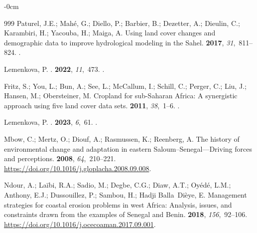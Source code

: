 \documentclass[earth,article,accept,pdftex,moreauthors]{Definitions/mdpi}
\begin{document}
{\begin{adjustwidth}{-\extralength}{0cm}
\begin{thebibliography}{999}
Paturel, J.E.; Mahé, G.; Diello, P.; Barbier, B.; Dezetter, A.; Dieulin, C.;
  Karambiri, H.; Yacouba, H.; Maiga, A.
\newblock Using land cover changes and demographic data to improve hydrological
  modeling in the Sahel.
 {\bf 2017}, {\em 31},~811--824.
.

Lemenkova, P.
.
 {\bf 2022}, {\em
  11},~473.
.

Fritz, S.; You, L.; Bun, A.; See, L.; McCallum, I.; Schill, C.; Perger, C.;
  Liu, J.; Hansen, M.; Obersteiner, M.
\newblock Cropland for sub-Saharan Africa: A synergistic approach using five
  land cover data sets.
 {\bf 2011}, {\em 38},~1--6. %
.

Lemenkova, P.
.
 {\bf 2023}, {\em 6},~61.
.

Mbow, C.; Mertz, O.; Diouf, A.; Rasmussen, K.; Reenberg, A.
\newblock The history of environmental change and adaptation in eastern
  Saloum–Senegal—Driving forces and perceptions.
 {\bf 2008}, {\em 64},~210--221. %
  {\url{https://doi.org/10.1016/j.gloplacha.2008.09.008}}.

Ndour, A.; Laïbi, R.A.; Sadio, M.; Degbe, C.G.; Diaw, A.T.; Oyédé, L.M.;
  Anthony, E.J.; Dussouillez, P.; Sambou, H.; Hadji Balla~Dièye, E.
\newblock Management strategies for coastal erosion problems in west Africa:
  Analysis, issues, and constraints drawn from the examples of Senegal and
  Benin.
 {\bf 2018}, {\em 156},~92--106. %
  {\url{https://doi.org/10.1016/j.ocecoaman.2017.09.001}}.


\end{thebibliography}
\end{adjustwidth}}
\end{document}
